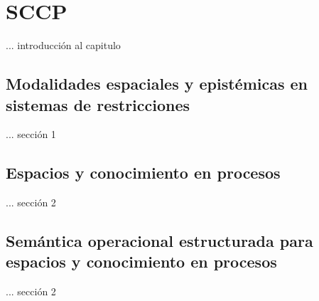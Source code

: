 \chapter{SCCP}
\label{cap3.sccp}      

... introducci\'on al capitulo


\section{Modalidades espaciales y epist\'emicas en sistemas de restricciones}
\label{mod.sccp}

... secci\'on 1


\section{Espacios y conocimiento en procesos}
\label{san.sccp}

... secci\'on 2


\section{Sem\'antica operacional estructurada para espacios y conocimiento en procesos}
\label{soe.esi}

... secci\'on 2
